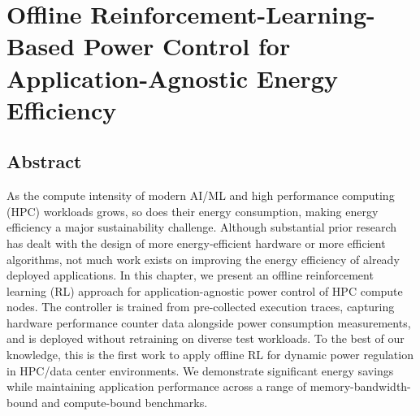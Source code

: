 

\chapter{Offline Reinforcement-Learning-Based Power Control for Application-Agnostic Energy Efficiency} \label{CH4_HPDC}

\graphicspath{{Papers/HPDC/}}

\section*{Abstract}
As the compute intensity of modern AI/ML and high performance computing (HPC) workloads
grows, so does their energy consumption, making energy efficiency a major
sustainability challenge. Although substantial prior research has dealt with the
design of more energy-efficient hardware or more efficient algorithms, not much
work exists on improving the energy efficiency of already deployed applications.
In this chapter, we present an offline reinforcement learning (RL) approach for
application-agnostic power control of HPC compute nodes. The controller is trained
from pre-collected execution traces, capturing hardware performance counter data
alongside power consumption measurements, and is deployed without retraining on
diverse test workloads. To the best of our knowledge, this is the first work to
apply offline RL for dynamic power regulation in HPC/data center environments.
We demonstrate significant energy savings while maintaining application performance
across a range of memory-bandwidth-bound and compute-bound benchmarks.
















